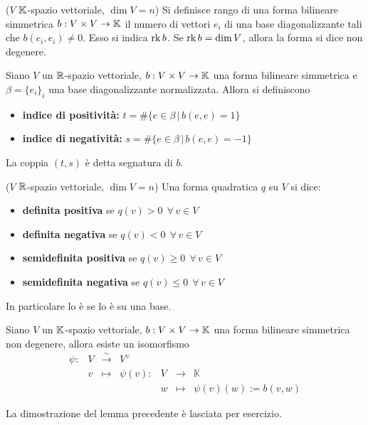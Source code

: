 \documentclass{article}     %
\begin{document}
\begin{boxdef}[Rango]
    ($V$ $\mathbb{K}$-spazio vettoriale, $\dim V=n$) Si definisce rango di una forma bilineare simmetrica $b:V\times V\to \mathbb{K}$ il numero di vettori $e_i$ di una base diagonalizzante tali che $b(e_i,e_i)\neq 0$. Esso si indica $\operatorname{rk} b$. Se $\operatorname{rk} b=\dim V$, allora la forma si dice non degenere.
\end{boxdef}
\begin{boxdef}[Segnatura]
    Siano $V$ un $\mathbb{R}$-spazio vettoriale, $b:V\times V\to \mathbb{K}$ una forma bilineare simmetrica e $\beta=\{e_i\}_i$ una base diagonalizzante normalizzata. 
    Allora si definiscono
    \begin{itemize}
        \item \textbf{indice di positività:} $t=\#\{e\in \beta\,|\, b(e,e)=1\}$
        \item \textbf{indice di negatività:} $s=\#\{e\in \beta\,|\, b(e,e)=-1\}$
    \end{itemize}
    La coppia $(t,s)$ è detta segnatura di $b$.
\end{boxdef}
\begin{boxdef}
    ($V$ $\mathbb{R}$-spazio vettoriale, $\dim V=n$) Una forma quadratica $q$ su $V$ si dice:
    \begin{itemize}
        \item \textbf{definita positiva} se $q(v)>0\ \ \forall\,v\in V $
        \item \textbf{definita negativa} se $q(v)<0\ \ \forall\,v\in V $
        \item \textbf{semidefinita positiva} se $q(v)\geq0\ \ \forall\,v\in V $
        \item \textbf{semidefinita negativa} se $q(v)\leq0\ \ \forall\,v\in V $ 
    \end{itemize}
\end{boxdef}
In particolare lo è se lo è su una base.
\begin{lemma}
    Siano $V$ un $\mathbb{K}$-spazio vettoriale, $b:V\times V\to \mathbb{K}$ una forma bilineare simmetrica non degenere, allora esiste un isomorfismo
    \[\begin{array}{ccccccl}            \psi : & V & \overset{\sim}{\longrightarrow}& V^\vee \\                 & v & \longmapsto     & \psi(v) : & V & \longrightarrow & \mathbb{K} \\&&&                 & w & \longmapsto     &\psi(v)(w):=b(v,w)       \end{array}\]
\end{lemma}
\begin{exc}\label{exc: lemma finestra}
    La dimostrazione del lemma precedente è lasciata per esercizio. 
\end{exc}
\end{document}
